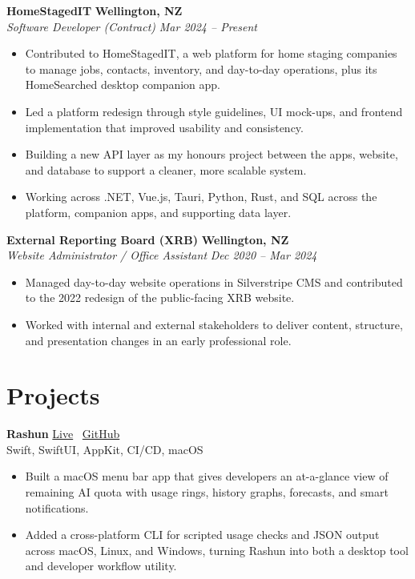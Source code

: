 \documentclass[9pt,letterpaper]{article}
\newcommand{\smallmuted}[1]{{\small\color{ResumeMuted} #1}}
\newcommand{\resumeRole}[4]{
  \Needspace{4\baselineskip}
  \vspace{0.12em}
  \textbf{#1} \hfill \textbf{#2} \\
  \textit{\small #3} \hfill \textit{\small #4} \\
  \vspace{0.1em}
}
\newcommand{\resumeProject}[4]{
  \Needspace{4\baselineskip}
  \vspace{0.12em}
  \textbf{#1} \hfill {\small #2} \\
  \smallmuted{#3} \\
  \vspace{0.08em}
  #4
}
\begin{document}
\resumeRole{HomeStagedIT}{Wellington, NZ}{Software Developer (Contract)}{Mar 2024 -- Present}
\begin{itemize}
  \item Contributed to HomeStagedIT, a web platform for home staging companies to manage jobs, contacts, inventory, and day-to-day operations, plus its HomeSearched desktop companion app.
  \item Led a platform redesign through style guidelines, UI mock-ups, and frontend implementation that improved usability and consistency.
  \item Building a new API layer as my honours project between the apps, website, and database to support a cleaner, more scalable system.
  \item Working across .NET, Vue.js, Tauri, Python, Rust, and SQL across the platform, companion apps, and supporting data layer.
\end{itemize}

\resumeRole{External Reporting Board (XRB)}{Wellington, NZ}{Website Administrator / Office Assistant}{Dec 2020 -- Mar 2024}
\begin{itemize}
  \item Managed day-to-day website operations in Silverstripe CMS and contributed to the 2022 redesign of the public-facing XRB website.
  \item Worked with internal and external stakeholders to deliver content, structure, and presentation changes in an early professional role.
\end{itemize}

\section*{Projects}
\resumeProject
  {Rashun}
  {\href{https://rashun.alexheffernan.dev}{Live} \textbar\ \href{https://github.com/AlexanderHeffernan/Rashun}{GitHub}}
  {Swift, SwiftUI, AppKit, CI/CD, macOS}
  {
    \begin{itemize}
      \item Built a macOS menu bar app that gives developers an at-a-glance view of remaining AI quota with usage rings, history graphs, forecasts, and smart notifications.
      \item Added a cross-platform CLI for scripted usage checks and JSON output across macOS, Linux, and Windows, turning Rashun into both a desktop tool and developer workflow utility.
    \end{itemize}
  }
\end{document}
